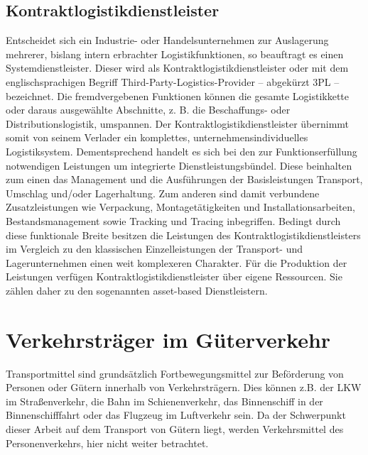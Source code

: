 \documentclass[a4paper,12pt]{scrreprt}
\begin{document}
	\section{Kontraktlogistikdienstleister}
	Entscheidet sich ein Industrie- oder Handelsunternehmen	zur Auslagerung mehrerer, bislang intern erbrachter Logistikfunktionen, so beauftragt es einen Systemdienstleister. Dieser wird als Kontraktlogistikdienstleister oder mit dem englischsprachigen Begriff Third-Party-Logistics-Provider – abgekürzt 3PL – bezeichnet. Die fremdvergebenen Funktionen können die gesamte Logistikkette oder daraus ausgewählte Abschnitte, z. B. die Beschaffungs- oder Distributionslogistik, umspannen. Der Kontraktlogistikdienstleister übernimmt somit von seinem Verlader ein komplettes, unternehmensindividuelles Logistiksystem. Dementsprechend handelt es sich bei den zur Funktionserfüllung notwendigen Leistungen um integrierte Dienstleistungsbündel. Diese beinhalten zum einen das Management und die Ausführungen der Basisleistungen Transport, Umschlag und/oder Lagerhaltung. Zum anderen sind damit verbundene Zusatzleistungen wie Verpackung, Montagetätigkeiten und Installationsarbeiten, Bestandsmanagement sowie Tracking und Tracing inbegriffen. Bedingt durch diese funktionale Breite besitzen die Leistungen des Kontraktlogistikdienstleisters im Vergleich zu den klassischen Einzelleistungen der Transport- und	Lagerunternehmen einen weit komplexeren Charakter. Für die Produktion der Leistungen verfügen Kontraktlogistikdienstleister über eigene Ressourcen. Sie zählen daher zu den sogenannten asset-based Dienstleistern.
	
	\chapter{Verkehrsträger im Güterverkehr}
	Transportmittel sind grundsätzlich Fortbewegungsmittel zur Beförderung von Personen oder Gütern innerhalb von Verkehrsträgern. Dies können z.B. der LKW im Straßenverkehr, die Bahn im Schienenverkehr, das Binnenschiff in der Binnenschifffahrt oder das Flugzeug im Luftverkehr sein. Da der Schwerpunkt dieser Arbeit auf dem Transport von Gütern liegt, werden Verkehrsmittel des Personenverkehrs, hier nicht weiter betrachtet.\\
	
\end{document}
